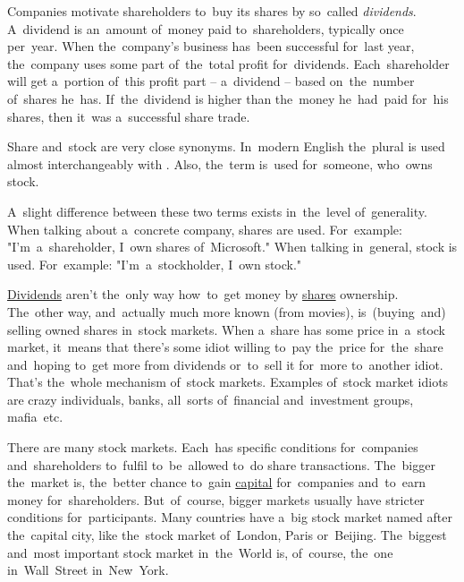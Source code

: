 Companies motivate shareholders to~buy its shares by so~called \textit{dividends}.
A~dividend is an~amount of~money paid to~shareholders, typically once per~year.
When the~company's business has~been successful for~last year, the~company uses some part of~the~total profit for~dividends.
Each~shareholder will get a~portion of~this profit part -- a~dividend -- based on~the~number of~shares he~has.
If~the~dividend is higher than the~money he~had~paid for~his shares, then it~was a~successful share trade.

Share and~stock are very close synonyms.
In~modern English the~plural  is used almost interchangeably with .
Also, the~term  is~used for~someone, who~owns stock.

A~slight difference between these two terms exists in~the~level of~generality.
When talking about a~concrete company, shares are used.
For~example:
"I'm~a~shareholder, I~own shares of~Microsoft."
When talking in~general, stock is used.
For~example:
"I'm~a~stockholder, I~own stock."

\hyperref[share]{Dividends} aren't the~only way how~to~get money by \hyperref[share]{shares} ownership.
The~other way, and~actually much more known (from movies), is~(buying~and) selling owned shares in~stock markets.
When a~share has some price in~a~stock market, it~means that there's some idiot willing to~pay the~price for~the~share and~hoping to~get more from dividends or~to~sell it for~more to~another idiot.
That's the~whole mechanism of~stock markets.
Examples of~stock market idiots are crazy individuals, banks, all~sorts of~financial and~investment groups, mafia~etc.

There are many stock markets.
Each~has specific conditions for~companies and~shareholders to~fulfil to~be~allowed to~do share transactions.
The~bigger the~market is, the~better chance to~gain \hyperref[capital]{capital} for~companies and~to~earn money for~shareholders.
But~of~course, bigger markets usually have stricter conditions for~participants.
Many countries have a~big stock market named after the~capital city, like the~stock market of~London, Paris or~Beijing.
The~biggest and~most important stock market in~the~World is, of~course, the~one in~Wall~Street in~New~York.
\newpage

